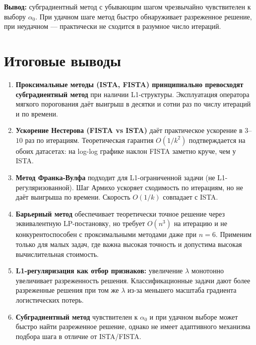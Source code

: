 \documentclass[a4paper,12pt]{article}
\begin{document}
\textbf{Вывод:} субградиентный метод с убывающим шагом чрезвычайно чувствителен к выбору $\alpha_0$.
При удачном шаге метод быстро обнаруживает разреженное решение, при неудачном — практически не сходится
в разумное число итераций.

\newpage
\section*{Итоговые выводы}

\begin{enumerate}
    \item \textbf{Проксимальные методы (ISTA, FISTA) принципиально превосходят субградиентный метод}
    при наличии L1-структуры. Эксплуатация оператора мягкого порогования даёт выигрыш в десятки и
    сотни раз по числу итераций и по времени.

    \item \textbf{Ускорение Нестерова (FISTA vs ISTA)} даёт практическое ускорение в $3$--$10$ раз
    по итерациям. Теоретическая гарантия $O(1/k^2)$ подтверждается на обоих датасетах:
    на log-log графике наклон FISTA заметно круче, чем у ISTA.

    \item \textbf{Метод Франка-Вулфа} подходит для L1-ограниченной задачи (не L1-регуляризованной).
    Шаг Армихо ускоряет сходимость по итерациям, но не даёт выигрыша по времени.
    Скорость $O(1/k)$ совпадает с ISTA.

    \item \textbf{Барьерный метод} обеспечивает теоретически точное решение через эквивалентную
    LP-постановку, но требует $O(n^3)$ на итерацию и не конкурентоспособен с проксимальными
    методами даже при $n = 6$. Применим только для малых задач, где важна высокая точность
    и допустима высокая вычислительная стоимость.

    \item \textbf{L1-регуляризация как отбор признаков:} увеличение $\lambda$ монотонно увеличивает
    разреженность решения. Классификационные задачи дают более разреженные решения при том же $\lambda$
    из-за меньшего масштаба градиента логистических потерь.

    \item \textbf{Субградиентный метод} чувствителен к $\alpha_0$ и при удачном выборе может
    быстро найти разреженное решение, однако не имеет адаптивного механизма подбора шага
    в отличие от ISTA/FISTA.
\end{enumerate}
\end{document}

